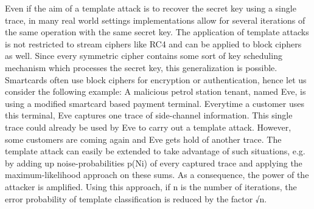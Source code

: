     Even if the aim of a template attack is to recover the secret key using a
    single trace, in many real world settings implementations allow for several
    iterations of the same operation with the same secret key. The application
    of template attacks is not restricted to stream ciphers like RC4 and can be
    applied to block ciphers as well. Since every symmetric cipher contains some
    sort of key scheduling mechanism which processes the secret key, this
    generalization is possible. Smartcards often use block ciphers for
    encryption or authentication, hence let us consider the following example: A
    malicious petrol station tenant, named Eve, is using a modified smartcard
    based payment terminal. Everytime a customer uses this terminal, Eve
    captures one trace of side-channel information. This single trace could
    already be used by Eve to carry out a template attack. However, some
    customers are coming again and Eve gets hold of another trace. The template
    attack can easily be extended to take advantage of such situations, e.g. by
    adding up noise-probabilities p(Ni) of every captured trace and applying the
    maximum-likelihood approach on these sums. As a consequence, the power of
    the attacker is amplified. Using this approach, if n is the number of
    iterations, the error probability of template classification is reduced by
    the factor √n. 
